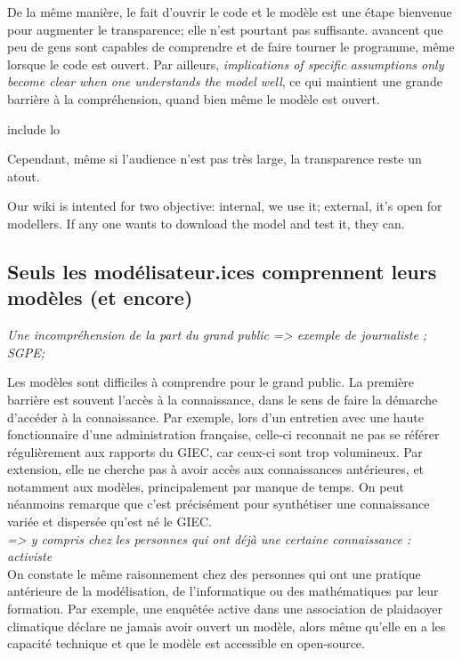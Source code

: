 De la même manière, le fait d'ouvrir le code et le modèle est une étape bienvenue pour augmenter le transparence; elle n'est pourtant pas suffisante. \cite{keppo_exploring_2021} avancent que peu de gens sont capables de comprendre et de faire tourner le programme, même lorsque le code est ouvert. Par ailleurs, \emph{implications of specific assumptions only become clear when one understands the model well}, ce qui maintient une grande barrière à la compréhension, quand bien même le modèle est ouvert. 

\begin{displayquote}
    include lo
\end{displayquote}
Cependant, même si l'audience n'est pas très large, la transparence reste un atout. 

\begin{displayquote}
Our wiki is intented for two objective: internal, we use it; external, it's open for modellers. If any one wants to download the model and test it, they can. 
\end{displayquote}

\subsection{Seuls les modélisateur.ices comprennent leurs modèles (et encore)}

\textit{Une incompréhension de la part du grand public
=> exemple de journaliste ; SGPE; }

Les modèles sont difficiles à comprendre pour le grand public. La première barrière est souvent l'accès à la connaissance, dans le sens de faire la démarche d'accéder à la connaissance. 
Par exemple, lors d'un entretien avec une haute fonctionnaire d'une administration française, celle-ci reconnait ne pas se référer régulièrement aux rapports du GIEC, car ceux-ci sont trop volumineux. Par extension, elle ne cherche pas à avoir accès aux connaissances antérieures, et notamment aux modèles, principalement par manque de temps. On peut néanmoins remarque que c'est précisément pour synthétiser une connaissance variée et dispersée qu'est né le GIEC. \\

\textit{=> y compris chez les personnes qui ont déjà une certaine connaissance : activiste} \\


On constate le même raisonnement chez des personnes qui ont une pratique antérieure de la modélisation, de l'informatique ou des mathématiques par leur formation. Par exemple, une enquêtée active dans une association de plaidaoyer climatique déclare ne jamais avoir ouvert un modèle, alors même qu'elle en a les capacité technique et que le modèle est accessible en open-source. 

